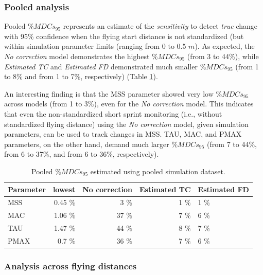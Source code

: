 \documentclass[fleqn,10pt,lineno]{wlpeerj} %
\begin{document}
\hypertarget{pooled-analysis-1}{%
\subsubsection{Pooled analysis}\label{pooled-analysis-1}}

Pooled \(\%MDCs_{95}\) represents an estimate of the \emph{sensitivity} to detect \emph{true} change with 95\% confidence when the flying start distance is not standardized (but within simulation parameter limits (ranging from 0 to 0.5 \(m\)). As expected, the \emph{No correction} model demonstrates the highest \(\%MDCs_{95}\) (from 3 to 44\%), while \emph{Estimated TC} and \emph{Estimated FD} demonstrated much smaller \(\%MDCs_{95}\) (from 1 to 8\% and from 1 to 7\%, respectively) (Table \ref{tab:tbl-pooled-MDC}).

An interesting finding is that the MSS parameter showed very low \(\%MDCs_{95}\) across models (from 1 to 3\%), even for the \emph{No correction} model. This indicates that even the non-standardized short sprint monitoring (i.e., without standardized flying distance) using the \emph{No correction} model, given simulation parameters, can be used to track changes in MSS. TAU, MAC, and PMAX parameters, on the other hand, demand much larger \(\%MDCs_{95}\) (from 7 to 44\%, from 6 to 37\%, and from 6 to 36\%, respectively).



\begin{table}

\caption{\label{tab:tbl-pooled-MDC}Pooled \(\%MDCs_{95}\) estimated using pooled simulation dataset.}
\centering
\begin{tabular}[t]{lrrrl}
\toprule
Parameter & lowest & No correction & Estimated TC & Estimated FD\\
\midrule
MSS & 0.45 \% & 3 \% & 1 \% & 1 \%\\
MAC & 1.06 \% & 37 \% & 7 \% & 6 \%\\
TAU & 1.47 \% & 44 \% & 8 \% & 7 \%\\
PMAX & 0.7 \% & 36 \% & 7 \% & 6 \%\\
\bottomrule
\end{tabular}
\end{table}

\hypertarget{analysis-across-flying-distances-1}{%
\subsubsection{Analysis across flying distances}\label{analysis-across-flying-distances-1}}
\end{document}
